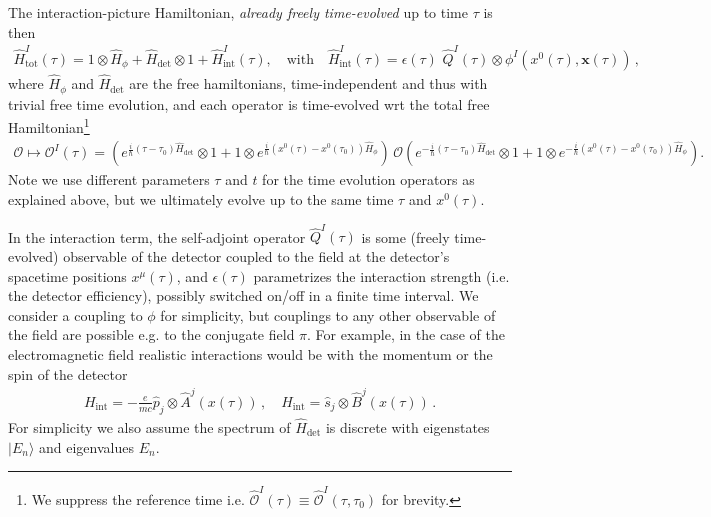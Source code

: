 \documentclass[../QFT_main.tex]{subfiles}
\begin{document}
\begin{mytheorem}
The interaction-picture Hamiltonian, \emph{already freely time-evolved} up to time $\tau$ is then
\begin{align}
    \hat{H}^I_{\mathrm{tot}}(\tau)= 1 \otimes \hat{H}_{\phi} + \hat{H}_{\mathrm{det}} \otimes 1 + \hat{H}_{\mathrm{int}}^I(\tau),\quad\text{with}\quad \hat{H}^I_{\mathrm{int}}(\tau) = \epsilon(\tau) \,\,\hat{Q}^I(\tau) \otimes \phi^I(x^0(\tau),\mathbf{x}(\tau))\,,
\end{align}
where $\hat{H}_{\phi}$ and $\hat{H}_{\mathrm{det}}$ are the free hamiltonians, time-independent and thus with trivial free time evolution, and each operator is time-evolved wrt the total free Hamiltonian\footnote{We suppress the reference time i.e. $\hat{\mathcal{O}}^I(\tau)\equiv \hat{\mathcal{O}}^I(\tau,\tau_0)$ for brevity.}
{\small
\begin{align}
    \mathcal{O}\mapsto \mathcal{O}^I(\tau)\!=\! \left(e^{\frac{i}{\hbar} (\tau-\tau_0)\hat{H}_{\mathrm{det}}}\otimes 1 + 1 \otimes e^{\frac{i}{\hbar}(x^0(\tau)-x^0(\tau_0)) \hat{H}_{\phi}}\right) \,\mathcal{O} \left(e^{-\frac{i}{\hbar} (\tau-\tau_0)\hat{H}_{\mathrm{det}}}\otimes 1 + 1 \otimes e^{-\frac{i}{\hbar}(x^0(\tau)-x^0(\tau_0)) \hat{H}_{\phi}}\right).
\end{align}
}
Note we use different parameters $\tau$ and $t$ for the time evolution operators as explained above, but we ultimately evolve up to the same time $\tau$ and $x^0(\tau)$.

In the interaction term, the self-adjoint operator $\hat{Q}^I(\tau)$ is some (freely time-evolved) observable of the detector coupled to the field at the detector's spacetime positions $x^\mu(\tau)$, and $\epsilon(\tau)$ parametrizes the interaction strength (i.e. the detector efficiency), possibly switched on/off in a finite time interval.
We consider a coupling to $\phi$ for simplicity, but couplings to any other observable of the field are possible e.g. to the conjugate field $\pi$. 
For example, in the case of the electromagnetic field realistic interactions would be with the momentum or the spin of the detector
\begin{align}
    H_{\mathrm{int}}=-\frac{e}{mc} \hat{p}_j\otimes \hat{A}^j(x(\tau))\,,\quad H_{\mathrm{int}} =\hat{s}_j \otimes \hat{B}^j(x(\tau))\,.
\end{align}
For simplicity we also assume the spectrum of $\hat{H}_{\mathrm{det}}$ is discrete with eigenstates $|E_n\rangle$ and eigenvalues $E_n$.


\end{mytheorem}
\end{document}

